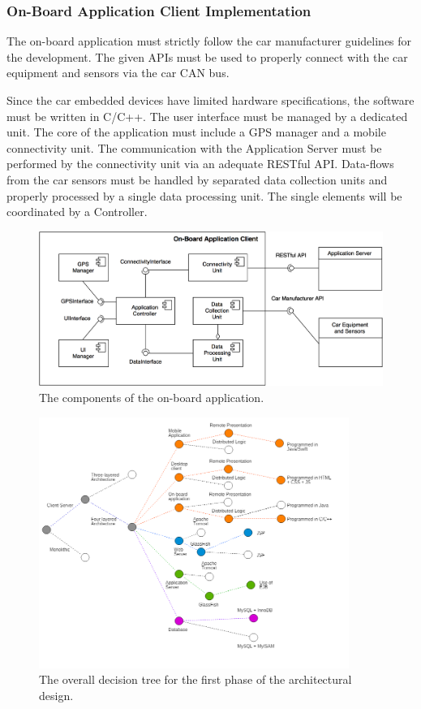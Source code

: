 \subsubsection{On-Board Application Client Implementation}
The on-board application must strictly follow the car manufacturer guidelines for the development. The given APIs must be used to properly connect with the car equipment and sensors via the car CAN bus.

Since the car embedded devices have limited hardware specifications, the software must be written in C/C++. The user interface must be managed by a dedicated unit. The core of the application must include a GPS manager and a mobile connectivity unit. The communication with the Application Server must be performed by the connectivity unit via an adequate RESTful API. Data-flows from the car sensors must be handled by separated data collection units and properly processed by a single data processing unit. The single elements will be coordinated by a Controller.

\begin{figure}[H]
\begin{center}
		\includegraphics[width=\textwidth]{./arch_design/diagrams/on_board_comps.png}
		\caption{The components of the on-board application.}
		\label{on_board_comps}
\end{center}
\end{figure}

\begin{figure}[H]
\begin{center}
		\includegraphics[width=0.9\textwidth]{./arch_design/diagrams/choices_tree.png}
		\caption{The overall decision tree for the first phase of the architectural design.}
		\label{overall_choices}
\end{center}
\end{figure}